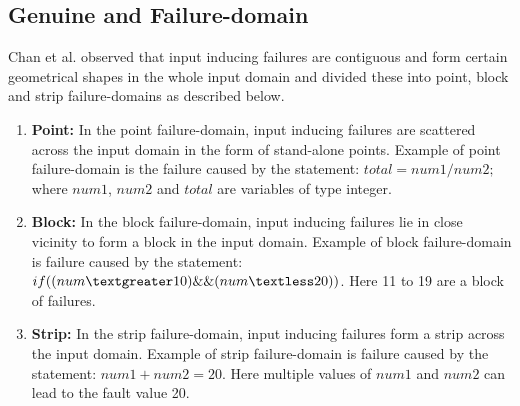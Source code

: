 \subsection{Genuine and Failure-domain} \label{sec:failuredomains_2}
\label{sec:genuineandfailuredomain}
Chan et al. \cite{chan1996proportional} observed that input inducing failures are contiguous and form certain geometrical shapes in the whole input domain and divided these into point, block and strip failure-domains as described below.

\begin{enumerate}
\item {\bf Point:} In the point failure-domain, input inducing failures are scattered across the input domain in the form of stand-alone points. Example of point failure-domain is the failure caused by the statement: $total = num1/num2;$ where $num1$, $num2$ and $total$ are variables of type integer.
\item {\bf Block:} In the block failure-domain, input inducing failures lie in close vicinity to form a block in the input domain. Example of block failure-domain is failure caused by the statement: $if ( (num \textgreater 10) \&\& (num \textless 20) )$. Here 11 to 19 are a block of failures.
\item {\bf Strip:} In the strip failure-domain, input inducing failures form a strip across the input domain. Example of strip failure-domain is failure caused by the statement: $num1 + num2 = 20$. Here multiple values of $num1$ and $num2$ can lead to the fault value 20. 
\end{enumerate}


